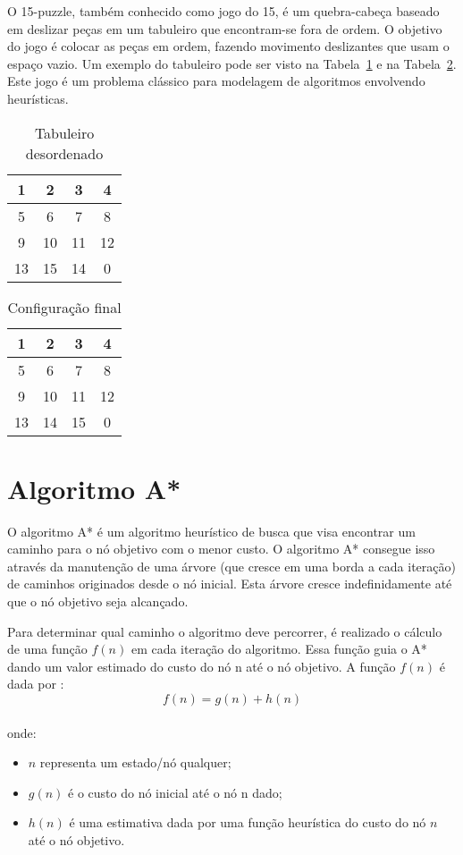 \documentclass[12pt]{article}
\begin{document}
O 15-puzzle, também conhecido como jogo do 15, é um quebra-cabeça baseado em deslizar peças em um tabuleiro que encontram-se fora de ordem. O objetivo do jogo é colocar as peças em ordem, fazendo movimento deslizantes que usam o espaço vazio. Um exemplo do tabuleiro pode ser visto na Tabela~\ref{tab:tabex} e na Tabela~\ref{tab:confinal}. Este jogo é um problema clássico para modelagem de algoritmos envolvendo heurísticas.

\begin{table}[H]
    \centering
    \begin{tabular}{|c|c|c|c|}
        \hline
        1 & 2 & 3 & 4 \\ \hline
        5 & 6 & 7 & 8 \\ \hline
        9 & 10 & 11 & 12 \\ \hline
        13 & 15 & 14 & 0 \\ \hline
    \end{tabular}
    \caption{Tabuleiro desordenado}
    \label{tab:tabex}
\end{table}

\begin{table}[H]
    \centering
    \begin{tabular}{|c|c|c|c|}
        \hline
        1 & 2 & 3 & 4 \\ \hline
        5 & 6 & 7 & 8 \\ \hline
        9 & 10 & 11 & 12 \\ \hline
        13 & 14 & 15 & 0 \\ \hline
    \end{tabular}
    \caption{Configuração final}
    \label{tab:confinal}
\end{table}

\section{Algoritmo A*}

O algoritmo A* é um algoritmo heurístico de busca que visa encontrar um caminho para o nó objetivo com o menor custo. O algoritmo A* consegue isso através da manutenção de uma árvore (que cresce em uma borda a cada iteração) de caminhos originados desde o nó inicial. Esta árvore cresce indefinidamente até que o nó objetivo seja alcançado.

Para determinar qual caminho o algoritmo deve percorrer, é realizado o cálculo de uma função $f(n)$ em cada iteração do algoritmo. Essa função guia o A* dando um valor estimado do custo do nó n até o nó objetivo. A função $f(n)$ é dada por : $$f(n) = g(n) + h(n)$$\\onde:
\begin{itemize}
    \item $n$ representa um estado/nó qualquer;
    \item $g(n)$ é o custo do nó inicial até o nó n dado;
    \item $h(n)$ é uma estimativa dada por uma função heurística do custo do nó $n$ até o nó objetivo.
\end{itemize}
\end{document}
